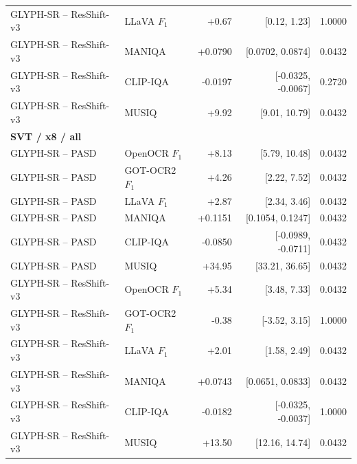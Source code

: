 \begin{longtable}{llrrr}
GLYPH-SR -- ResShift-v3 & LLaVA $F_1$ & +0.67 & [0.12, 1.23] & 1.0000 \\
GLYPH-SR -- ResShift-v3 & MANIQA & +0.0790 & [0.0702, 0.0874] & 0.0432 \\
GLYPH-SR -- ResShift-v3 & CLIP-IQA & -0.0197 & [-0.0325, -0.0067] & 0.2720 \\
GLYPH-SR -- ResShift-v3 & MUSIQ & +9.92 & [9.01, 10.79] & 0.0432 \\
\midrule
\multicolumn{5}{l}{\textbf{SVT / x8 / all}}\\
\midrule
GLYPH-SR -- PASD & OpenOCR $F_1$ & +8.13 & [5.79, 10.48] & 0.0432 \\
GLYPH-SR -- PASD & GOT-OCR2 $F_1$ & +4.26 & [2.22, 7.52] & 0.0432 \\
GLYPH-SR -- PASD & LLaVA $F_1$ & +2.87 & [2.34, 3.46] & 0.0432 \\
GLYPH-SR -- PASD & MANIQA & +0.1151 & [0.1054, 0.1247] & 0.0432 \\
GLYPH-SR -- PASD & CLIP-IQA & -0.0850 & [-0.0989, -0.0711] & 0.0432 \\
GLYPH-SR -- PASD & MUSIQ & +34.95 & [33.21, 36.65] & 0.0432 \\
GLYPH-SR -- ResShift-v3 & OpenOCR $F_1$ & +5.34 & [3.48, 7.33] & 0.0432 \\
GLYPH-SR -- ResShift-v3 & GOT-OCR2 $F_1$ & -0.38 & [-3.52, 3.15] & 1.0000 \\
GLYPH-SR -- ResShift-v3 & LLaVA $F_1$ & +2.01 & [1.58, 2.49] & 0.0432 \\
GLYPH-SR -- ResShift-v3 & MANIQA & +0.0743 & [0.0651, 0.0833] & 0.0432 \\
GLYPH-SR -- ResShift-v3 & CLIP-IQA & -0.0182 & [-0.0325, -0.0037] & 1.0000 \\
GLYPH-SR -- ResShift-v3 & MUSIQ & +13.50 & [12.16, 14.74] & 0.0432 \\
\midrule
\end{longtable}
\endgroup
